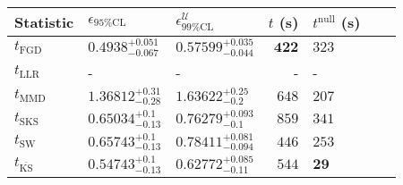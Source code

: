 \begin{tabular}{l|llr|llr}
	Statistic & $\epsilon_{95\%\mathrm{CL}}$ & $\epsilon^    {\mathcal{U}}_{99\%\mathrm{CL}}$ & $t$ (s) & $t^{\mathrm{null}}$ (s) \\
	\midrule
	$t_{\mathrm{FGD}}$ & ${\mathbf{0.4938_{-0.067}^{+0.051}}}$ & ${\mathbf{0.57599_{-0.044}^{+0.035}}}$ & ${\mathbf{422}}$ & $323$ \\
	$t_{\mathrm{LLR}}$ & - & - & - & - \\
	$t_{\mathrm{MMD}}$ & $1.36812_{-0.28}^{+0.31}$ & $1.63622_{-0.2}^{+0.25}$ & $648$ & $207$ \\
	$t_{\mathrm{SKS}}$ & $0.65034_{-0.13}^{+0.1}$ & $0.76279_{-0.1}^{+0.093}$ & $859$ & $341$ \\
	$t_{\mathrm{SW}}$ & $0.65743_{-0.13}^{+0.1}$ & $0.78411_{-0.094}^{+0.081}$ & $446$ & $253$ \\
	$t_{\overline{\mathrm{KS}}}$ & $0.54743_{-0.13}^{+0.1}$ & $0.62772_{-0.11}^{+0.085}$ & $544$ & ${\mathbf{29}}$ \\
	\bottomrule
\end{tabular}